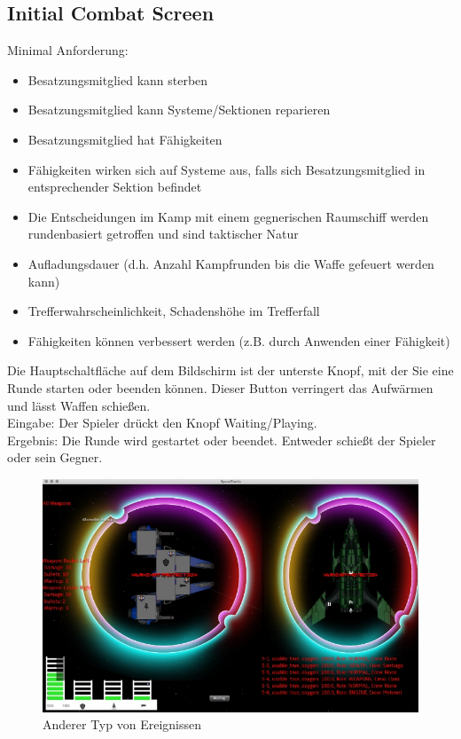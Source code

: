 \documentclass[12pt]{article}
\begin{document}
\subsection{Initial Combat Screen}
Minimal Anforderung:
\begin{itemize}
\item  Besatzungsmitglied kann sterben
\item Besatzungsmitglied kann Systeme/Sektionen reparieren
\item Besatzungsmitglied hat Fähigkeiten
\item Fähigkeiten wirken sich auf Systeme aus, falls sich Besatzungsmitglied in entsprechender Sektion befindet
\item Die Entscheidungen im Kamp mit einem gegnerischen Raumschiff werden
rundenbasiert getroffen und sind taktischer Natur
\item Aufladungsdauer (d.h. Anzahl Kampfrunden bis die Waffe gefeuert
werden kann)
\item Trefferwahrscheinlichkeit, Schadenshöhe im Trefferfall
\item Fähigkeiten können verbessert werden (z.B. durch Anwenden einer Fähigkeit)
\end{itemize}
Die Hauptschaltfläche auf dem Bildschirm ist der unterste Knopf, mit der Sie eine Runde starten oder beenden können. Dieser Button verringert das Aufwärmen und lässt Waffen schießen.\\
Eingabe: Der Spieler drückt den Knopf Waiting/Playing.\\
Ergebnis: Die Runde wird gestartet oder beendet. Entweder schießt der Spieler oder sein Gegner.\\
\begin{figure}[htp]
\centering
\includegraphics[scale=0.7]{TestProtocolBilder/OptimizedinitialBattelScreen.png}
\caption{Anderer Typ von Ereignissen}
\end{figure}
\end{document}
